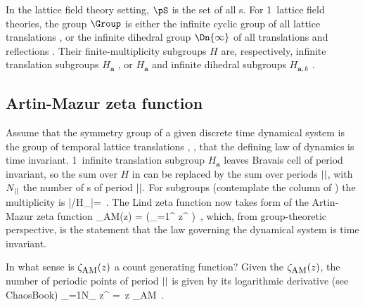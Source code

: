 In the lattice field theory setting, $\pS$ is the set of all
{\lattstate}s.
For 1\dmn\ lattice field theories, the group $\Group$ is either the
{infinite cyclic group}  \Cn{\infty} of all lattice translations ,
or
the {infinite dihedral group} $\Dn{\infty}$  of all translations and
reflections .
Their finite-multiplicity subgroups $H$ are,
respectively, infinite translation subgroups $H_{\mathbf{a}}$
, or $H_{\mathbf{a}}$ and infinite dihedral subgroups
$H_{\mathbf{a},k}$ .

\subsection{Artin-Mazur zeta function}
\label{sect:ArtinMazur}

Assume that the symmetry group of a given discrete time dynamical system
is the group of temporal lattice translations \Cn{\infty}, \ie, that the
defining law of dynamics is time invariant. 1\dmn\ infinite translation
subgroup $H_{\mathbf{a}}$  leaves {Bravais cell} of
{period} \cl{}  invariant, so the sum over $H$ in
 can be replaced by the sum over periods $\cl{}$, with
$N_\cl{}$ the number of {\lattstate}s of period $\cl{}$. For \Cn{\infty}
subgroups (contemplate the \Cn{\infty} column of
) %
the multiplicity is
\beq
|\Cn{\infty}/H_\cl{}|=\cl{}
\,.
The Lind zeta function
 now takes form of the Artin-Mazur zeta
func\-tion
\beq
\zeta_{\mbox{\footnotesize AM}}(z) =
     \exp\left(\sum_{\cl{}=1}^\infty
{} z^\cl{}
         \right)
\,,
which, from group-theoretic perspective, is the statement that the law
governing the dynamical system is time invariant.

In what sense is $\zeta_{\mbox{\footnotesize AM}}(z)$ a {\lattstate}
count generating  function? Given the $\zeta_{\mbox{\footnotesize
AM}}(z)$, the number of periodic points of period $\cl{}$ is given by its
logarithmic derivative (see
{ChaosBook})
\beq
\sum_{\cl{}=1}N_\cl{} z^\cl{}
    = 
            \,z \zeta_{\mbox{\footnotesize AM}}
\,.

